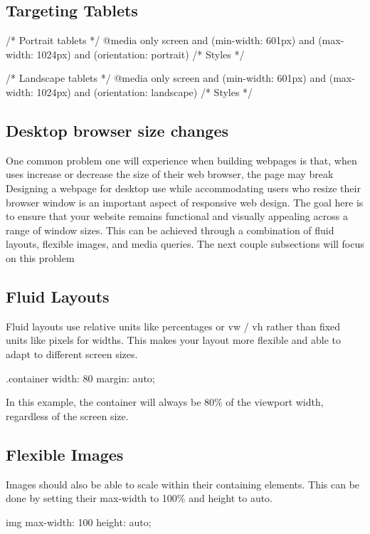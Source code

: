 \documentclass{report}
\begin{document}
    \bigbreak \noindent 
    \subsection{Targeting Tablets}
    \begin{csscode}
    /* Portrait tablets */
    @media only screen and (min-width: 601px) and (max-width: 1024px) and (orientation: portrait) {
        /* Styles */
    }

    /* Landscape tablets */
    @media only screen and (min-width: 601px) and (max-width: 1024px) and (orientation: landscape) {
        /* Styles */
    }
    \end{csscode}

    \pagebreak \bigbreak \noindent 
    \subsection{Desktop browser size changes}
    \bigbreak \noindent 
    One common problem one will experience when building webpages is that, when uses increase or decrease the size of their web browser, the page may break
    \bigbreak \noindent 
    Designing a webpage for desktop use while accommodating users who resize their browser window is an important aspect of responsive web design. The goal here is to ensure that your website remains functional and visually appealing across a range of window sizes. This can be achieved through a combination of fluid layouts, flexible images, and media queries.
    \bigbreak \noindent 
    The next couple subsections will focus on this problem

    \bigbreak \noindent 
    \subsection{Fluid Layouts}
    \bigbreak \noindent 
    Fluid layouts use relative units like percentages or vw / vh rather than fixed units like pixels for widths. This makes your layout more flexible and able to adapt to different screen sizes.
    \bigbreak \noindent 
    \begin{csscode}
    .container {
        width: 80%
        margin: auto;
    }
    \end{csscode}
    \bigbreak \noindent 
    In this example, the container will always be 80\% of the viewport width, regardless of the screen size.

    \bigbreak \noindent 
    \subsection{Flexible Images}
    \bigbreak \noindent 
    Images should also be able to scale within their containing elements. This can be done by setting their max-width to 100\% and height to auto.
    \bigbreak \noindent 
    \begin{csscode}
    img {
        max-width: 100%
        height: auto;
    }
    \end{csscode}
\end{document}
